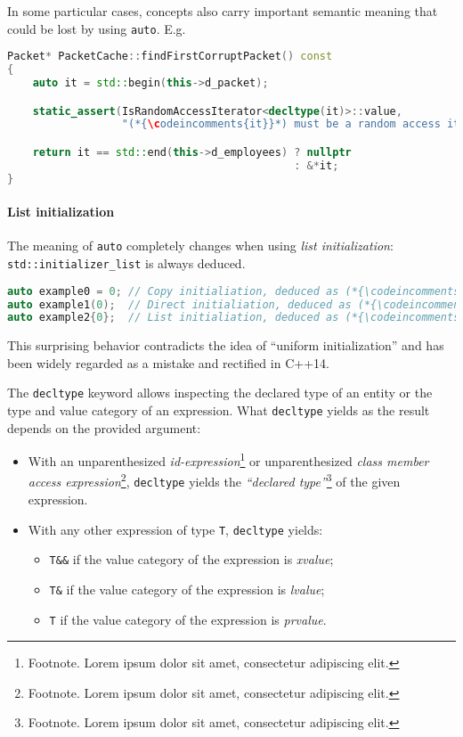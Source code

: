 \documentclass[twoside,10pt,letterpaper,usenames]{newstyle-PearsonGeneric-7-38}
\newcommand{\codeincomments}{\color{skyblue}\ttfamily}
\begin{document}
In some particular cases, concepts also carry important semantic meaning
that could be lost by using \texttt{auto}. E.g.

\begin{lstlisting}[language=C++]
Packet* PacketCache::findFirstCorruptPacket() const
{
    auto it = std::begin(this->d_packet);

    static_assert(IsRandomAccessIterator<decltype(it)>::value,
                  "(*{\codeincomments{it}}*) must be a random access iterator.");

    return it == std::end(this->d_employees) ? nullptr
                                             : &*it;
}
\end{lstlisting}
    

\paragraph[List initialization]{List initialization}\label{list-initialization}

The meaning of \texttt{auto} completely changes when using \emph{list
initialization}: \texttt{std::initializer\_list} is always deduced.

\begin{lstlisting}[language=C++]
auto example0 = 0; // Copy initialiation, deduced as (*{\codeincomments{int}}*).
auto example1(0);  // Direct initialiation, deduced as (*{\codeincomments{int}}*).
auto example2{0};  // List initialiation, deduced as (*{\codeincomments{std::initializer\_list<int>}}*).
\end{lstlisting}
    

This surprising behavior contradicts the idea of ``uniform
initialization'' and has been widely regarded as a mistake and rectified
in C++14.

The \texttt{decltype} keyword allows inspecting the declared type of an
entity or the type and value category of an expression. What
\texttt{decltype} yields as the result depends on the provided argument:

\begin{itemize}
\item{With an unparenthesized \emph{id-expression}\cprotect\footnote{Footnote. Lorem ipsum dolor sit amet, consectetur adipiscing elit.} or unparenthesized \emph{class member access expression}\cprotect\footnote{Footnote. Lorem ipsum dolor sit amet, consectetur adipiscing elit.}, \texttt{decltype} yields the \emph{``declared type''}\cprotect\footnote{Footnote. Lorem ipsum dolor sit amet, consectetur adipiscing elit.} of the given expression.}
\item{With any other expression of type \texttt{T}, \texttt{decltype} yields:\begin{itemize}
\item{\texttt{T\&\&} if the value category of the expression is \emph{xvalue};}
\item{\texttt{T\&} if the value category of the expression is \emph{lvalue};}
\item{\texttt{T} if the value category of the expression is \emph{prvalue}.}
\end{itemize}
}
\end{itemize}
\end{document}
